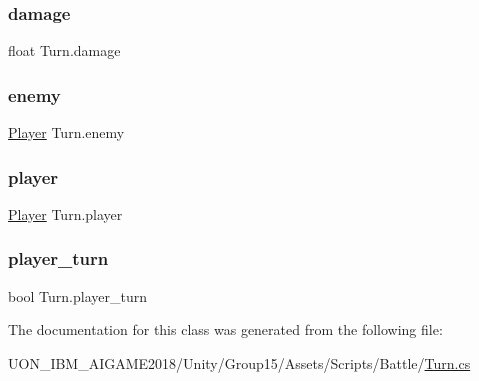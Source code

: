 \subsubsection{\texorpdfstring{damage}{damage}}
{\footnotesize\ttfamily float Turn.\+damage}

\mbox{\label{class_turn_a4ceac3369c1d8eb19b2ad8ac4925b9a7}} 
\subsubsection{\texorpdfstring{enemy}{enemy}}
{\footnotesize\ttfamily \mbox{\hyperlink{class_player}{Player}} Turn.\+enemy}

\mbox{\label{class_turn_abcef0253137bf6c75965b66e5f7a4d5e}} 
\subsubsection{\texorpdfstring{player}{player}}
{\footnotesize\ttfamily \mbox{\hyperlink{class_player}{Player}} Turn.\+player}

\mbox{\label{class_turn_ae3877d2983475bd0123819bfb1ad3fa9}} 
\subsubsection{\texorpdfstring{player\_turn}{player\_turn}}
{\footnotesize\ttfamily bool Turn.\+player\+\_\+turn}



The documentation for this class was generated from the following file\+:\begin{DoxyCompactItemize}
\item 
U\+O\+N\+\_\+\+I\+B\+M\+\_\+\+A\+I\+G\+A\+M\+E2018/\+Unity/\+Group15/\+Assets/\+Scripts/\+Battle/\mbox{\hyperlink{_turn_8cs}{Turn.\+cs}}\end{DoxyCompactItemize}
